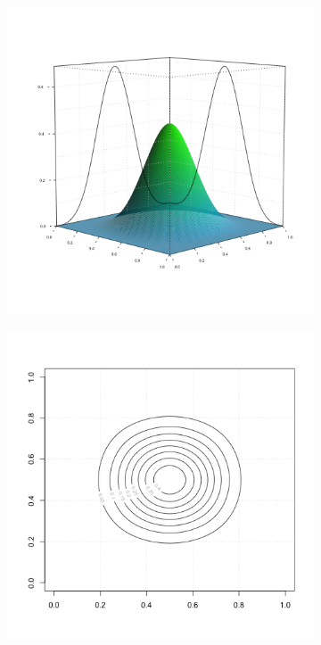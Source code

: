 \begin{figure}[H]
  \caption{\textit{ Tensor product of two cubic B-splines }}\label{fig:bicubic-bspline-function}
    \begin{center}
 \begin{subfigure}[t]{0.48\textwidth}
  \centering
  \includegraphics[width=\textwidth]{img/bicubic_basis_function}
  \end{subfigure}
 \begin{subfigure}[t]{.48\textwidth}
  \centering
\includegraphics[width=\textwidth]{img/bicubic_bspline_contour}
 \end{subfigure}
 \end{center}
\end{figure}

